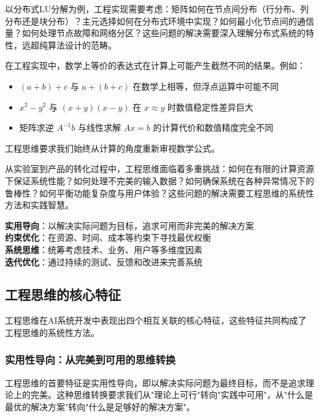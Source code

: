 以分布式LU分解为例，工程实现需要考虑：矩阵如何在节点间分布（行分布、列分布还是块分布）？主元选择如何在分布式环境中实现？如何最小化节点间的通信量？如何处理节点故障和网络分区？这些问题的解决需要深入理解分布式系统的特性，远超纯算法设计的范畴。

\begin{tcolorbox}[colback=red!5!white,colframe=red!75!black,title=警示：数学等价≠计算等价]
在工程实现中，数学上等价的表达式在计算上可能产生截然不同的结果。例如：
\begin{itemize}
\item $(a+b)+c$ 与 $a+(b+c)$ 在数学上相等，但浮点运算中可能不同
\item $x^2-y^2$ 与 $(x+y)(x-y)$ 在 $x \approx y$ 时数值稳定性差异巨大
\item 矩阵求逆 $A^{-1}b$ 与线性求解 $Ax=b$ 的计算代价和数值精度完全不同
\end{itemize}
工程思维要求我们始终从计算的角度重新审视数学公式。
\end{tcolorbox}

从实验室到产品的转化过程中，工程思维面临着多重挑战：如何在有限的计算资源下保证系统性能？如何处理不完美的输入数据？如何确保系统在各种异常情况下的鲁棒性？如何平衡功能复杂度与用户体验？这些问题的解决需要工程思维的系统性方法和实践智慧。

\begin{tcolorbox}[colback=orange!5!white,colframe=orange!75!black,title=核心概念：工程思维的四大支柱]
\textbf{实用导向}：以解决实际问题为目标，追求可用而非完美的解决方案\\
\textbf{约束优化}：在资源、时间、成本等约束下寻找最优权衡\\
\textbf{系统思维}：统筹考虑技术、业务、用户等多维度因素\\
\textbf{迭代优化}：通过持续的测试、反馈和改进来完善系统
\end{tcolorbox}

\subsection{工程思维的核心特征}

工程思维在AI系统开发中表现出四个相互关联的核心特征，这些特征共同构成了工程思维的系统性方法。


\subsubsection{实用性导向：从完美到可用的思维转换}
工程思维的首要特征是实用性导向，即以解决实际问题为最终目标，而不是追求理论上的完美。这种思维转换要求我们从"理论上可行"转向"实践中可用"，从"什么是最优的解决方案"转向"什么是足够好的解决方案"。

